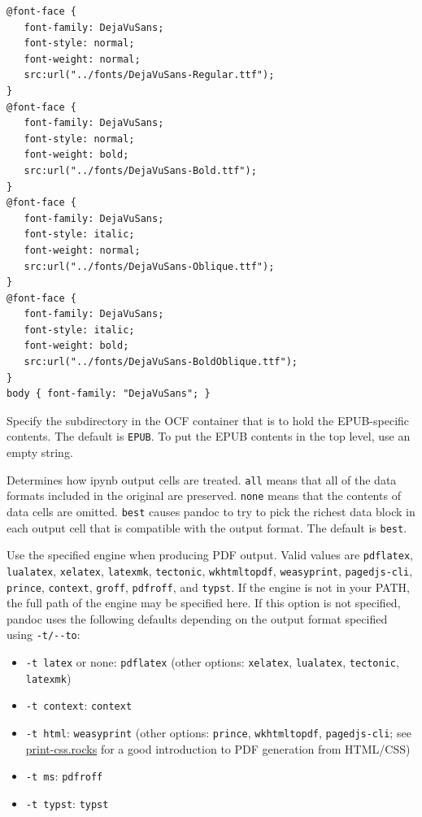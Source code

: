\documentclass[
]{article}
\providecommand{\tightlist}{%
  \setlength{\itemsep}{0pt}\setlength{\parskip}{0pt}}
\begin{document}
\begin{description}
\begin{verbatim}
@font-face {
   font-family: DejaVuSans;
   font-style: normal;
   font-weight: normal;
   src:url("../fonts/DejaVuSans-Regular.ttf");
}
@font-face {
   font-family: DejaVuSans;
   font-style: normal;
   font-weight: bold;
   src:url("../fonts/DejaVuSans-Bold.ttf");
}
@font-face {
   font-family: DejaVuSans;
   font-style: italic;
   font-weight: normal;
   src:url("../fonts/DejaVuSans-Oblique.ttf");
}
@font-face {
   font-family: DejaVuSans;
   font-style: italic;
   font-weight: bold;
   src:url("../fonts/DejaVuSans-BoldOblique.ttf");
}
body { font-family: "DejaVuSans"; }
\end{verbatim}
\item[\texttt{-\/-epub-subdirectory=}\emph{DIRNAME}]
Specify the subdirectory in the OCF container that is to hold the
EPUB-specific contents. The default is \texttt{EPUB}. To put the EPUB
contents in the top level, use an empty string.
\item[\texttt{-\/-ipynb-output=all\textbar{}none\textbar{}best}]
Determines how ipynb output cells are treated. \texttt{all} means that
all of the data formats included in the original are preserved.
\texttt{none} means that the contents of data cells are omitted.
\texttt{best} causes pandoc to try to pick the richest data block in
each output cell that is compatible with the output format. The default
is \texttt{best}.
\item[\texttt{-\/-pdf-engine=}\emph{PROGRAM}]
Use the specified engine when producing PDF output. Valid values are
\texttt{pdflatex}, \texttt{lualatex}, \texttt{xelatex},
\texttt{latexmk}, \texttt{tectonic}, \texttt{wkhtmltopdf},
\texttt{weasyprint}, \texttt{pagedjs-cli}, \texttt{prince},
\texttt{context}, \texttt{groff}, \texttt{pdfroff}, and \texttt{typst}.
If the engine is not in your PATH, the full path of the engine may be
specified here. If this option is not specified, pandoc uses the
following defaults depending on the output format specified using
\texttt{-t/-\/-to}:

\begin{itemize}
\tightlist
\item
  \texttt{-t\ latex} or none: \texttt{pdflatex} (other options:
  \texttt{xelatex}, \texttt{lualatex}, \texttt{tectonic},
  \texttt{latexmk})
\item
  \texttt{-t\ context}: \texttt{context}
\item
  \texttt{-t\ html}: \texttt{weasyprint} (other options:
  \texttt{prince}, \texttt{wkhtmltopdf}, \texttt{pagedjs-cli}; see
  \href{https://print-css.rocks}{print-css.rocks} for a good
  introduction to PDF generation from HTML/CSS)
\item
  \texttt{-t\ ms}: \texttt{pdfroff}
\item
  \texttt{-t\ typst}: \texttt{typst}
\end{itemize}


\end{description}
\end{document}
